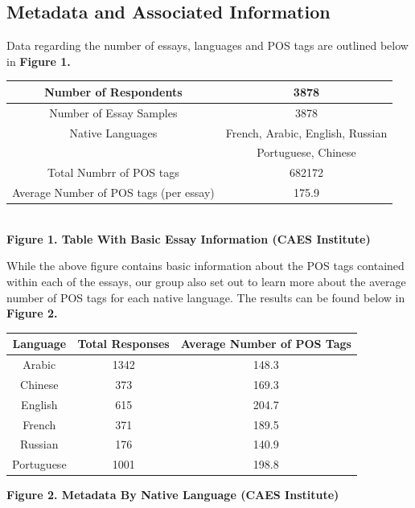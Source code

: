 \documentclass[12pt]{article}
\newcommand\tab[1][1cm]{\hspace*{#1}}
\begin{document}
 \subsection{Metadata and Associated Information}
 \tab Data regarding the number of essays, languages and POS tags are outlined below in \textbf{Figure 1.}
 \begin{center}
 	\begin{tabular}{|c|c|}
 		\hline
 		Number of Respondents & 3878\\
 		\hline
 		Number of Essay Samples & 3878\\
		\hline
		Native Languages & French, Arabic,
		English, Russian\\
		  & Portuguese, Chinese\\
			\hline
		Total Numbrr of POS tags & 682172\\
			\hline
		Average Number of POS tags (per essay) & 175.9\\
			\hline
 	\end{tabular}\\
 	\textbf{Figure 1. Table With Basic Essay Information (CAES Institute)}
 \end{center}
While the above figure contains basic information about the POS tags contained within each of the essays, our group also set out to learn more about the average number of POS tags for each native language. The results can be found below in \textbf{Figure 2.}
 \begin{center}
 	\begin{tabular}{|c|c|c|}
 		\hline
 		\textbf{Language} & \textbf{Total Responses} & \textbf{Average Number of POS Tags}\\
 		\hline
 		Arabic & 1342 & 148.3\\
 		\hline
 		Chinese & 373 & 169.3\\
 		\hline
 		English & 615 & 204.7\\
 		\hline
 		French & 371 & 189.5\\
 		\hline
 		Russian & 176 & 140.9\\
 		\hline
 		Portuguese & 1001 & 198.8\\
 		\hline
 	\end{tabular}
 	\textbf{Figure 2. Metadata By Native Language (CAES Institute)}
 \end{center}
\end{document}
